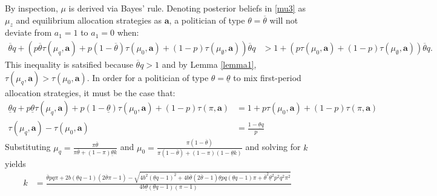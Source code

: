 \documentclass[11pt,english]{article}
\begin{document}
 By inspection, $\mu$ is derived via Bayes' rule.  Denoting posterior beliefs in \eqref{mu3} as $\mu_z$ and equilibrium allocation strategies as $\boldsymbol{a}$, a politician of type $\theta = \overline{\theta}$ will not deviate from $a_1 = 1$ to $a_1=0$ when:
 \begin{align*}
\overline{\theta}q + (p\overline{\theta}\tau(\mu_q, \boldsymbol{a}) + p(1-\overline{\theta})\tau(\mu_0 , \boldsymbol{a}) + (1-p) \tau(\mu_\emptyset, \boldsymbol{a}))\overline{\theta}q& > 1 + \left(p\tau(\mu_0 , \boldsymbol{a}) + (1-p) \tau(\mu_\emptyset, \boldsymbol{a})\right) \overline{\theta}q.
\end{align*} 
This inequality is satsified because $\overline{\theta}q > 1$ and by Lemma \ref{lemma1}, $\tau(\mu_q, \boldsymbol{a}) > \tau(\mu_0, \boldsymbol{a})$. In order for a politician of type $\theta = \underline{\theta}$ to mix first-period allocation strategies, it must be the case that: 
\begin{align*}
\underline{\theta}q + p\underline{\theta}\tau(\mu_q, \boldsymbol{a}) + p(1-\underline{\theta})\tau(\mu_0, \boldsymbol{a}) + (1-p)\tau(\pi, \boldsymbol{a}) &= 1 + p\tau(\mu_0, \boldsymbol{a}) + (1-p)\tau(\pi, \boldsymbol{a})\\
\tau(\mu_q, \boldsymbol{a})-\tau(\mu_0, \boldsymbol{a}) &= \frac{1-\underline{\theta}q}{p}
\end{align*}
Substituting $\mu_q = \frac{\pi \overline{\theta}}{\pi \overline{\theta} + (1-\pi)\underline{\theta}k}$ and $\mu_0 = \frac{\pi (1-\overline{\theta})}{\pi (1-\overline{\theta}) + (1-\pi)(1-\underline{\theta}k)}$ and solving for $k$ yields
\begin{align*}
k&= \frac{\overline{\theta}pq\pi + 2b(\underline{\theta}q - 1)(2\overline{\theta}\pi-1)-\sqrt{4b^2(\underline{\theta}q-1)^2+4 b \overline{\theta}(2\overline{\theta}-1)\underline{\theta}pq(\underline{\theta}q-1)\pi+ \overline{\theta}^2\underline{\theta}^2p^2q^2\pi^2}}{4b\underline{\theta}(\underline{\theta}q -1)(\pi-1)}
\end{align*}
\end{document}
